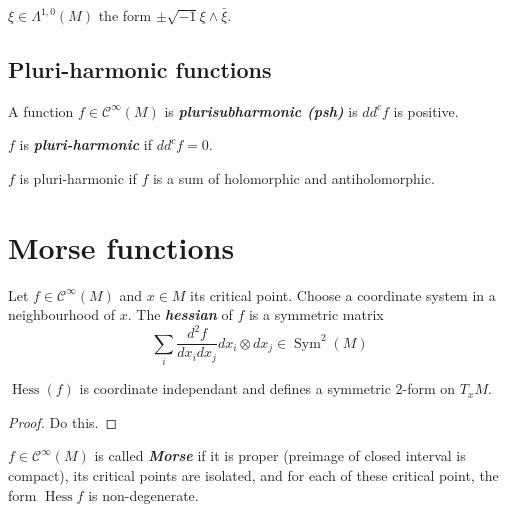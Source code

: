 \begin{example}\leavevmode
	$\xi\in\Lambda^{1,0}(M)$ the form $\pm \sqrt{-1}\xi\wedge \bar{\xi} $.
\end{example}

\subsection{Pluri-harmonic functions}

\begin{defn}\leavevmode
	A function $ f \in\mathcal{C}^\infty(M)$ is \textit{\textbf{plurisubharmonic (psh)}} is  $d d^cf$ is positive.
\end{defn}

\begin{defn}\leavevmode
	$f$ is  \textit{\textbf{pluri-harmonic}} if  $d d^cf=0$.
\end{defn}

\begin{thm}[Exercise]\leavevmode
	$f$ is pluri-harmonic if $f$ is a sum of holomorphic and antiholomorphic.
\end{thm}

\section{Morse functions}

\begin{defn}\leavevmode
	Let $f \in \mathcal{C}^\infty(M)$ and $x\in M$ its critical point. Choose a coordinate system in a neighbourhood of $x$. The \textit{\textbf{hessian}} of  $f$ is a symmetric matrix
	\[\sum_{i}\frac{d^2 f}{dx_idx_j}dx_i \otimes dx_j\in\operatorname{Sym}^2(M)\]
\end{defn}

\begin{claim}\leavevmode
	$\operatorname{Hess}(f)$ is coordinate independant and defines a symmetric 2-form on $T_xM$.
\end{claim}

\begin{proof}\leavevmode
	Do this.
\end{proof}

\begin{defn}\leavevmode
	$f \in \mathcal{C}^\infty(M)$ is called \textit{\textbf{Morse}} if it is proper (preimage of closed interval is compact), its critical points are isolated, and for each of these critical point, the form  $\operatorname{Hes s}f$ is non-degenerate.
\end{defn}

